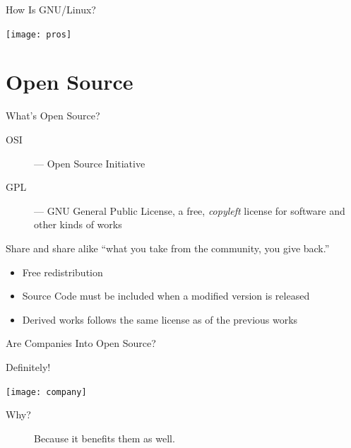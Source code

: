 \begin{frame}{How Is GNU/Linux?}
  \begin{center}
    \texttt{[image: pros]}
  \end{center}
\end{frame}

\section{Open Source}

\begin{frame}{What's Open Source?}
  \begin{description}
  \item[OSI] --- Open Source Initiative
  \item[GPL] --- GNU General Public License, a free, \emph{copyleft} license for software and
    other kinds of works
  \end{description}
  \begin{block}{Share and share alike}
    {\small\purisa ``what you take from the community, you give back.''}
    \begin{itemize}
    \item Free redistribution
    \item Source Code must be included when a modified version is
      released
    \item Derived works follows the same license as of the previous
      works
    \end{itemize}
  \end{block}
\end{frame}

\begin{frame}{Are Companies Into Open Source?}
  \begin{block}{Definitely!}
    \begin{center}
      \texttt{[image: company]}
    \end{center}
  \end{block}
  \begin{description}
  \item[Why?]  Because it benefits them as well.
  \end{description}
\end{frame}

